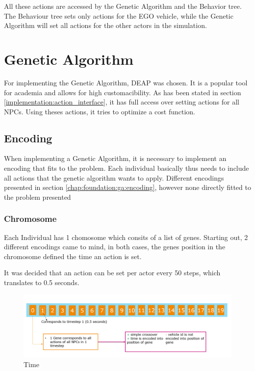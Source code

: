 All these actions are accessed by the Genetic Algorithm and the Behavior tree. The Behaviour tree sets only actions for the EGO vehicle, while the Genetic Algorithm will set all actions for the other actors in the simulation.



\section{Genetic Algorithm}
For implementing the Genetic Algorithm, DEAP was chosen. It is a popular tool for academia  and allows for high customacibility.
As has been stated in section \ref{implementation:action_interface}, it has full access over setting actions for all NPCs. Using theses actions, it tries to optimize a cost function.

\subsection{Encoding}
When implementing a Genetic Algorithm, it is necessary to implement an encoding that fits to the problem. Each individual basically thus needs to include all actions that the genetic algorithm wants to apply. Different encodings presented in section \ref{chap:foundation:ga:encoding}, however none directly fitted to the problem presented

\subsubsection{Chromosome}
Each Individual has 1 chomosome which consits of a list of genes. Starting out, 2 different encodings came to mind, in both cases, the genes position in the chromosome defined the time an action is set.

It was decided that an action can be set per actor every 50 steps, which translates to 0.5 seconds.

\begin{figure}[ht] 
	\includegraphics[width=1\linewidth]{figures/time_encoding}
	\caption{Time}
	\label{figure:encoding:chromosome:time}
\end{figure}

